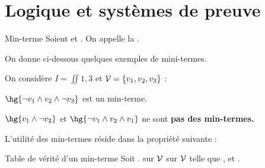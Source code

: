 \documentclass[a4paper,french,bookmarks]{book}
\begin{document}
    \dominitoc\nomtcrule 
    {\sffamily\tableofcontents}\mtcaddchapter\pagestyle{toc}
    
    
    
    \pagestyle{plain}
    
    \chapter{Logique et systèmes de preuve}
    
    
    
    \begin{definition}{Min-terme}{}
        Soient  et . On appelle  la .
    \end{definition}
    On donne ci-dessous quelques exemples de mini-termes.
    \begin{example}{}{}
        On considère $I = \iint{1, 3}$ et $\mathcal{V} = \left\{v_1, v_2, v_3\right\}$ :
        \begin{enumerate}
            \itt $\hg{\neg v_1 \land v_2 \land \neg v_3}$ est un min-terme.
            
            \itt $\hg{v_1 \land \neg v_2}$ et $\hg{\neg v_1 \land v_2 \land v_1}$ ne sont \bf{pas} des min-termes.
        \end{enumerate}
    \end{example}
    L'utilité des min-termes réside dans la propriété suivante :
    \begin{property}{Table de vérité d'un min-terme}{}
        Soit .  sur $\mathcal{V}$  sur $\mathcal{V}$ telle que , et .
    \end{property}
\end{document}
